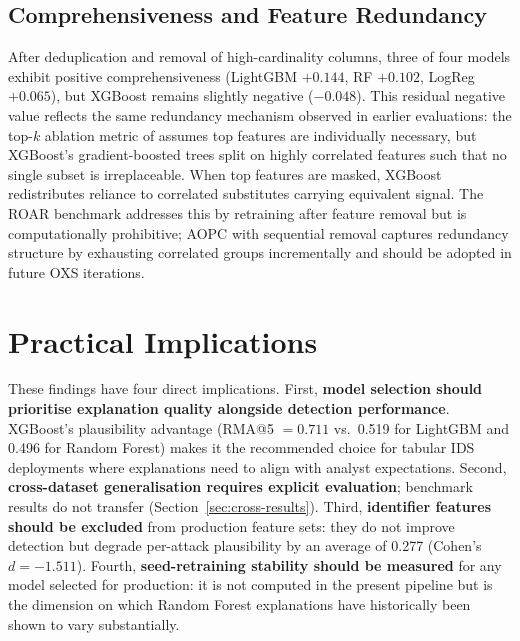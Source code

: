 \documentclass[12pt,a4paper]{report}
\begin{document}
\subsection{Comprehensiveness and Feature Redundancy}
\label{sec:neg-comp}

After deduplication and removal of high-cardinality columns, three of four models exhibit positive comprehensiveness (LightGBM $+0.144$, RF $+0.102$, LogReg $+0.065$), but XGBoost remains slightly negative ($-0.048$). This residual negative value reflects the same redundancy mechanism observed in earlier evaluations: the top-$k$ ablation metric of \cite{deyoung2020} assumes top features are individually necessary, but XGBoost's gradient-boosted trees split on highly correlated features such that no single subset is irreplaceable. When top features are masked, XGBoost redistributes reliance to correlated substitutes carrying equivalent signal. The ROAR benchmark \cite{hooker2019} addresses this by retraining after feature removal but is computationally prohibitive; AOPC with sequential removal \cite{samek2017} captures redundancy structure by exhausting correlated groups incrementally and should be adopted in future OXS iterations.

\section{Practical Implications}
\label{sec:practical}

These findings have four direct implications. First, \textbf{model selection should prioritise explanation quality alongside detection performance}. XGBoost's plausibility advantage (RMA@5 $= 0.711$ vs.\ 0.519 for LightGBM and 0.496 for Random Forest) makes it the recommended choice for tabular IDS deployments where explanations need to align with analyst expectations. Second, \textbf{cross-dataset generalisation requires explicit evaluation}; benchmark results do not transfer (Section~\ref{sec:cross-results}). Third, \textbf{identifier features should be excluded} from production feature sets: they do not improve detection but degrade per-attack plausibility by an average of 0.277 (Cohen's $d = -1.511$). Fourth, \textbf{seed-retraining stability should be measured} for any model selected for production: it is not computed in the present pipeline but is the dimension on which Random Forest explanations have historically been shown to vary substantially.
\end{document}
